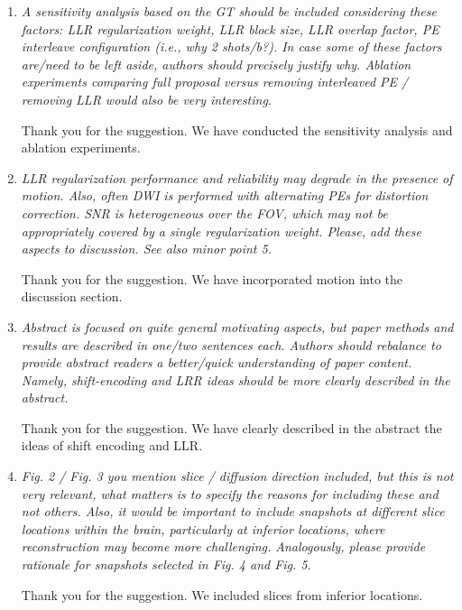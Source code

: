 \documentclass[a4paper,11pt,twoside]{report}
\begin{document}
\begin{enumerate}
    \item \textit{A sensitivity analysis based on the GT should be included considering these factors: LLR regularization weight, LLR block size, LLR overlap factor, PE interleave configuration (i.e., why 2 shots/b?). In case some of these factors are/need to be left aside, authors should precisely justify why. Ablation experiments comparing full proposal versus removing interleaved PE / removing LLR would also be very interesting.}

    \hspace{1em} Thank you for the suggestion.
    We have conducted the sensitivity analysis and ablation experiments.

    \item \textit{LLR regularization performance and reliability may degrade in the presence of motion. Also, often DWI is performed with alternating PEs for distortion correction. SNR is heterogeneous over the FOV, which may not be appropriately covered by a single regularization weight. Please, add these aspects to discussion. See also minor point 5.}

    \hspace{1em} Thank you for the suggestion.
    We have incorporated motion into the discussion section.

    \item \textit{Abstract is focused on quite general motivating aspects, but paper methods and results are described in one/two sentences each. Authors should rebalance to provide abstract readers a better/quick understanding of paper content. Namely, shift-encoding and LRR ideas should be more clearly described in the abstract.}

    \hspace{1em} Thank you for the suggestion. We have clearly described
    in the abstract the ideas of shift encoding and LLR.

    \item \textit{Fig. 2 / Fig. 3 \textrightarrow you mention slice / diffusion direction included, but this is not very relevant, what matters is to specify the reasons for including these and not others. Also, it would be important to include snapshots at different slice locations within the brain, particularly at inferior locations, where reconstruction may become more challenging. Analogously, please provide rationale for snapshots selected in Fig. 4 and Fig. 5.}

    \hspace{1em} Thank you for the suggestion.
    We included slices from inferior locations.


\end{enumerate}
\end{document}
